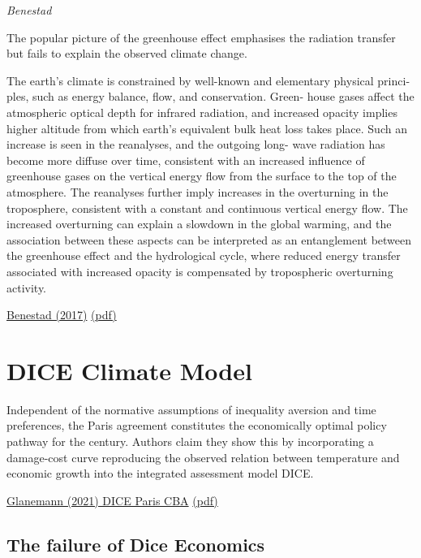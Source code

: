 \documentclass[
]{book}
\begin{document}
\emph{Benestad}

The popular picture of the greenhouse effect
emphasises the radiation transfer but fails to explain the
observed climate change.

The earth's climate is
constrained by well-known and elementary physical princi-
ples, such as energy balance, flow, and conservation. Green-
house gases affect the atmospheric optical depth for infrared
radiation, and increased opacity implies higher altitude from
which earth's equivalent bulk heat loss takes place. Such an
increase is seen in the reanalyses, and the outgoing long-
wave radiation has become more diffuse over time, consistent
with an increased influence of greenhouse gases on the
vertical energy flow from the surface to the top of the atmosphere.
The reanalyses further imply increases in the overturning
in the troposphere, consistent with a constant and
continuous vertical energy flow. The increased overturning
can explain a slowdown in the global warming, and the
association between these aspects can be interpreted as an
entanglement between the greenhouse effect and the hydrological cycle,
where reduced energy transfer associated with increased opacity
is compensated by tropospheric overturning activity.

\href{https://link.springer.com/article/10.1007/s00704-016-1732-y}{Benestad (2017)}
\href{pdf/Benestad_2017_Mental_Picture_of_Greenhouse_Effect.pdf}{(pdf)}

\hypertarget{dice-climate-model}{%
\section{DICE Climate Model}\label{dice-climate-model}}

Independent of the
normative assumptions of inequality aversion and time preferences,
the Paris agreement constitutes the economically optimal policy pathway
for the century.
Authors claim they show this by incorporating a
damage-cost curve reproducing
the observed relation between temperature
and economic growth into the integrated assessment model DICE.

\href{https://www.nature.com/articles/s41467-019-13961-1}{Glanemann (2021) DICE Paris CBA}
\href{pdf/Glanemann_2021_DICE_Paris_CBA.pdf}{(pdf)}

\hypertarget{the-failure-of-dice-economics}{%
\subsection{The failure of Dice Economics}\label{the-failure-of-dice-economics}}
\end{document}
